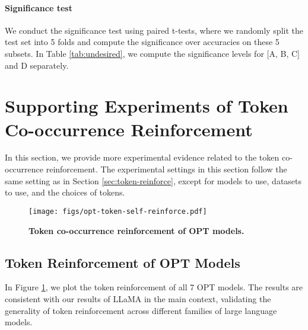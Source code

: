 
\paragraph{Significance test}
We conduct the significance test using paired t-tests, where we randomly split the test set into 5 folds and compute the significance over accuracies on these 5 subsets. In Table \ref{tab:undesired}, we compute the significance levels for [A, B, C] and D separately. 



\section{Supporting Experiments of Token Co-occurrence Reinforcement}
\label{sec:support_exps}
In this section, we provide more experimental evidence related to the token co-occurrence reinforcement. 
The experimental settings in this section follow the same setting as in Section \ref{sec:token-reinforce}, except for models to use, datasets to use, and the choices of tokens. 

\begin{figure}[htbp]
    \centering
    \texttt{[image: figs/opt-token-self-reinforce.pdf]}
  \caption{\textbf{Token co-occurrence reinforcement of OPT models.} }
  \label{fig:opt-token-reinforce}
\end{figure}

\subsection{Token Reinforcement of OPT Models}

In Figure \ref{fig:opt-token-reinforce}, we plot the token reinforcement of all 7 OPT models. The results are consistent with our results of LLaMA in the main context, validating the generality of token reinforcement across different families of large language models.  

